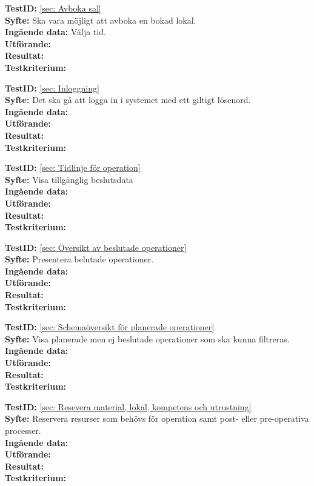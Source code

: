\documentclass[a4paper,10pt, twoside]{article}
\begin{document}
  \textbf{TestID:} \ref{sec: Avboka sal}
  \\ \textbf{Syfte:} Ska vara möjligt att avboka en bokad lokal.
  \\ \textbf{Ingående data:} Välja tid.
  \\ \textbf{Utförande:}
  \\ \textbf{Resultat:}
  \\ \textbf{Testkriterium:}

  \textbf{TestID:} \ref{sec: Inloggning}
  \\ \textbf{Syfte:} Det ska gå att logga in i systemet med ett giltigt lösenord.
  \\ \textbf{Ingående data:}
  \\ \textbf{Utförande:}
  \\ \textbf{Resultat:}
  \\ \textbf{Testkriterium:}

  \textbf{TestID:} \ref{sec: Tidlinje för operation}
  \\ \textbf{Syfte:} Visa tillgänglig beslutsdata
  \\ \textbf{Ingående data:}
  \\ \textbf{Utförande:}
  \\ \textbf{Resultat:}
  \\ \textbf{Testkriterium:}

  \textbf{TestID:} \ref{sec: Översikt av beslutade operationer}
  \\ \textbf{Syfte:} Presentera belutade operationer.
  \\ \textbf{Ingående data:}
  \\ \textbf{Utförande:}
  \\ \textbf{Resultat:}
  \\ \textbf{Testkriterium:}

  \textbf{TestID:} \ref{sec: Schemaöversikt för planerade operationer}
  \\ \textbf{Syfte:} Visa planerade men ej beslutade operationer som ska kunna filtreras.
  \\ \textbf{Ingående data:}
  \\ \textbf{Utförande:}
  \\ \textbf{Resultat:}
  \\ \textbf{Testkriterium:}

  \textbf{TestID:} \ref{sec: Resevera material, lokal, kompetens och utrustning}
  \\ \textbf{Syfte:} Reservera resurser som behövs för operation samt post- eller pre-operativa processer.
  \\ \textbf{Ingående data:}
  \\ \textbf{Utförande:}
  \\ \textbf{Resultat:}
  \\ \textbf{Testkriterium:}
\end{document}
